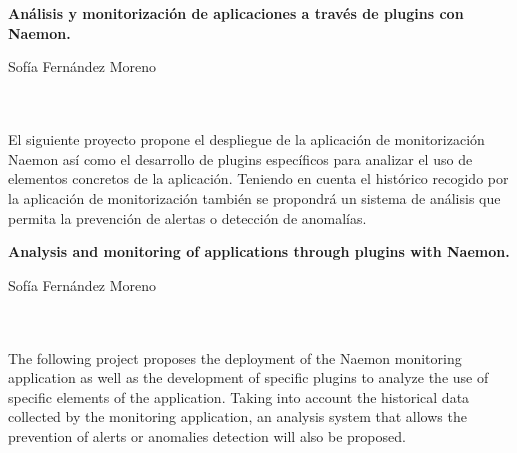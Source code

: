 \chapter*{}



\cleardoublepage
\thispagestyle{empty}

\begin{center}
{\large\bfseries Análisis y monitorización de aplicaciones a través de plugins con Naemon.}\\
\end{center}
\begin{center}
Sofía Fernández Moreno\\
\end{center}

\\

\vspace{0.7cm}
\\

El siguiente proyecto propone el despliegue de la aplicación de monitorización Naemon así como el desarrollo de plugins específicos para analizar el uso de elementos concretos de la aplicación. Teniendo en cuenta el histórico recogido por la aplicación de monitorización también se propondrá un sistema de análisis que permita la prevención de alertas o detección de anomalías.
\cleardoublepage

\thispagestyle{empty}

\begin{center}
{\large\bfseries Analysis and monitoring of applications through plugins with Naemon.}\\
\end{center}
\begin{center}
Sofía Fernández Moreno\\
\end{center}

\\

\vspace{0.7cm}
\\

The following project proposes the deployment of the Naemon monitoring application as well as the development of specific plugins to analyze the use of specific elements of the application. Taking into account the historical data collected by the monitoring application, an analysis system that allows the prevention of alerts or anomalies detection will also be proposed.

